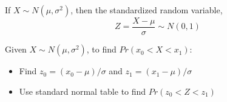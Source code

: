 \documentclass{./../../Latex/handout}
\begin{document}
\thispagestyle{plain}
\begin{center}
\end{center}	

If $X \sim N(\mu, \sigma^2)$, then the standardized random variable,
$$ Z = \frac{X-\mu}{\sigma} \sim N(0,1) $$

Given $X \sim N(\mu, \sigma^2)$, to find $Pr(x_0<X<x_1)$: \vspace{-1em}
\begin{itemize}
\item Find $z_0 = (x_0-\mu)/\sigma$ and $z_1 = (x_1-\mu)/\sigma$
\item Use standard normal table to find $Pr(z_0<Z<z_1)$ \\~\\
\end{itemize}
\end{document}
